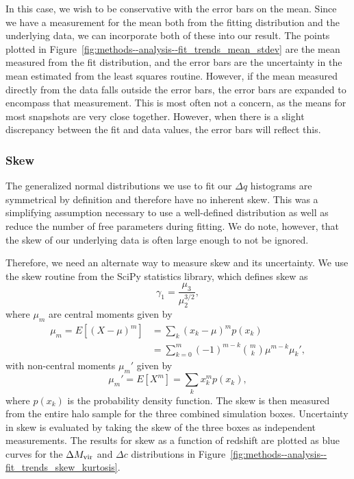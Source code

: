 In this case, we wish to be conservative with the error bars on the mean.  Since we have a measurement for the mean both from the fitting distribution and the underlying data, we can incorporate both of these into our result.  The points plotted in Figure~\ref{fig:methods--analysis--fit_trends_mean_stdev} are the mean measured from the fit distribution, and the error bars are the uncertainty in the mean estimated from the least squares routine.  However, if the mean measured directly from the data falls outside the error bars, the error bars are expanded to encompass that measurement.  This is most often not a concern, as the means for most snapshots are very close together.  However, when there is a slight discrepancy between the fit and data values, the error bars will reflect this.



\subsubsection{Skew}
\label{subsubsec:analysis--redshift_trends--skew}


The generalized normal distributions we use to fit our $\Delta q$ histograms are symmetrical by definition and therefore have no inherent skew.  This was a simplifying assumption necessary to use a well-defined distribution as well as reduce the number of free parameters during fitting.  We do note, however, that the skew of our underlying data is often large enough to not be ignored.

Therefore, we need an alternate way to measure skew and its uncertainty.  We use the skew routine from the SciPy statistics library, which defines skew as
\begin{equation} \label{eq:skew_def}
	\gamma_{1} = \frac{ \mu_{3} }{ \mu_{2}^{3/2} },
\end{equation}
where $\mu_{m}$ are central moments given by
\begin{align} \label{eq:central_moments}
	\mu_{m} = E[(X - \mu)^{m}] &= \sum_{k} (x_{k} - \mu)^{m} p(x_{k}) \\
	                           &= \sum_{k=0}^{m} (-1)^{m - k} \binom{m}{k} \mu^{m - k} \mu_{k}',
\end{align}
with non-central moments $\mu_{m}'$ given by
\begin{equation} \label{eq:non-central_moments}
	\mu_{m}' = E[X^{m}] = \sum_{k} x_{k}^{m} p(x_{k}),
\end{equation}
where $p(x_{k})$ is the probability density function.  The skew is then measured from the entire halo sample for the three combined simulation boxes.  Uncertainty in skew is evaluated by taking the skew of the three boxes as independent measurements.  The results for skew as a function of redshift are plotted as blue curves for the $\Delta {M_{\mathrm{vir}}}$ and $\Delta c$ distributions in Figure~\ref{fig:methods--analysis--fit_trends_skew_kurtosis}.

